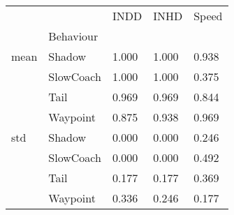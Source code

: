 \begin{tabular}{lllll}
\toprule
     &        &  INDD &  INHD & Speed \\
{} & Behaviour &       &       &       \\
\midrule
mean & Shadow & 1.000 & 1.000 & 0.938 \\
     & SlowCoach & 1.000 & 1.000 & 0.375 \\
     & Tail & 0.969 & 0.969 & 0.844 \\
     & Waypoint & 0.875 & 0.938 & 0.969 \\
std & Shadow & 0.000 & 0.000 & 0.246 \\
     & SlowCoach & 0.000 & 0.000 & 0.492 \\
     & Tail & 0.177 & 0.177 & 0.369 \\
     & Waypoint & 0.336 & 0.246 & 0.177 \\
\bottomrule
\end{tabular}
